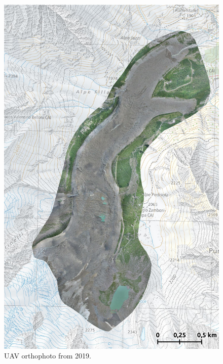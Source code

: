 \begin{figure}[p]
    \centering
    \includegraphics[height=\textheight]{figures/appendix/orto_2019.jpg}
    \caption{UAV orthophoto from 2019.}
\end{figure}


